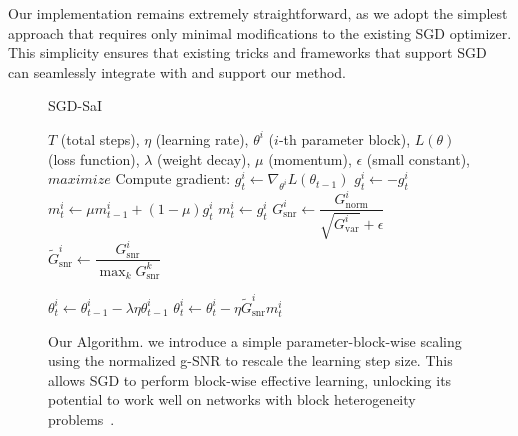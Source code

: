 Our implementation remains extremely straightforward, as we adopt the simplest approach that requires only minimal modifications to the existing SGD optimizer. This simplicity ensures that existing tricks and frameworks that support SGD can seamlessly integrate with and support our method.
\begin{figure}[!ht]
    \centering
    \begin{minipage}{0.45\textwidth}
        \begin{algorithm}[H]
            \caption{SGD-SaI}\label{algorithm:sgd_boost}
            \footnotesize
            \begin{algorithmic}[1]
                \Require $T$ (total steps), $\eta$ (learning rate), $\theta^i$ ($i$-th parameter block), $L(\theta)$ (loss function), $\lambda$ (weight decay), $\mu$ (momentum), $\epsilon$ (small constant), $maximize$
                    \State Compute gradient: $g^i_t \gets \nabla_{\theta^i} L(\theta_{t-1})$
                        \State $g^i_t \gets -g^i_t$
                    \EndIf
                    \State {}
                        \State $m^i_t \gets \mu m^i_{t-1} + (1 - \mu) g^i_t$
                    \Else
                        \State $m^i_t \gets g^i_t$
                        \State {}
                        \State $G_{\text{snr}}^i \gets \dfrac{G_{\text{norm}}^i}{\sqrt{G_{\text{var}}^i} + \epsilon}$
                        \State {}
                        \State $\tilde{G}_{\text{snr}}^i \gets \dfrac{G_{\text{snr}}^i}{\max_k G_{\text{snr}}^k}$
                    \EndIf

                    \State {}
                    \State $\theta^i_t \gets \theta^i_{t-1} - \lambda \eta \theta^i_{t-1}$
                    \State {}
                    \State $\theta^i_t \gets \theta^i_t - \eta \tilde{G}_{\text{snr}}^i m^i_t$
                \EndFor
            \end{algorithmic}
        \end{algorithm}
    \end{minipage}
    \caption{Our Algorithm. we introduce a simple parameter-block-wise scaling using the normalized g-SNR to rescale the learning step size. This allows SGD to perform block-wise effective learning, unlocking its potential to work well on networks with block heterogeneity problems~\cite{zhang2024transformers}.}
    \label{algo:algorithm_cmp}
\end{figure}

